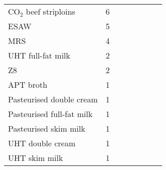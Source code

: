 \documentclass[11pt]{article}
\newcommand{\subsc}[1]{\ensuremath{_{\textrm{#1}}}}
\begin{document}
\begin{table}[htbp]
\begin{tabularx}{\linewidth}{l*{7}{Y}}
			CO\subsc{2} beef striploins & 6 \\
			ESAW & 5 \\
			MRS & 4 \\
			UHT full-fat milk & 2 \\
			Z8 & 2 \\
			APT broth & 1 \\
			Pasteurised double cream & 1 \\
			Pasteurised full-fat milk & 1 \\
			Pasteurised skim milk & 1 \\
			UHT double cream & 1 \\
			UHT skim milk & 1 \\
			\bottomrule
		\end{tabularx}
	\end{table}
	
\end{document}
